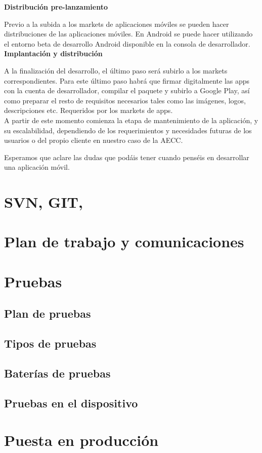 \documentclass[../pfc.tex]{subfiles}
\begin{document}
	\textbf{Distribución pre-lanzamiento}
	
	Previo a la subida a los markets de aplicaciones móviles se pueden hacer distribuciones de las aplicaciones móviles. En Android se puede hacer utilizando el entorno beta de desarrollo  Android disponible en la consola de desarrollador.\\
	
	\textbf{Implantación y distribución}
	
	A la finalización del desarrollo, el último paso será subirlo a los markets correspondientes. Para este último paso habrá que firmar digitalmente las apps con la cuenta de desarrollador, compilar el paquete y subirlo a Google Play, así como preparar el resto de requisitos necesarios tales como las imágenes, logos, descripciones etc. Requeridos por los markets de apps.\\
	A partir de este momento comienza la etapa de mantenimiento de la aplicación, y su escalabilidad, dependiendo de los requerimientos y necesidades futuras de los usuarios o del propio cliente en  nuestro caso de la AECC.
	
	Esperamos que aclare las dudas que podáis tener cuando penséis en desarrollar una aplicación móvil.
	
	\section{SVN, GIT,}
	
	\section{Plan de trabajo y comunicaciones}
	
	\section{Pruebas}
	
	\subsection{Plan de pruebas}
	
	\subsection{Tipos de pruebas}
		
	\subsection{Baterías de pruebas}
		
	\subsection{Pruebas en el dispositivo}
	
	\section{Puesta en producción}
	
\end{document}
